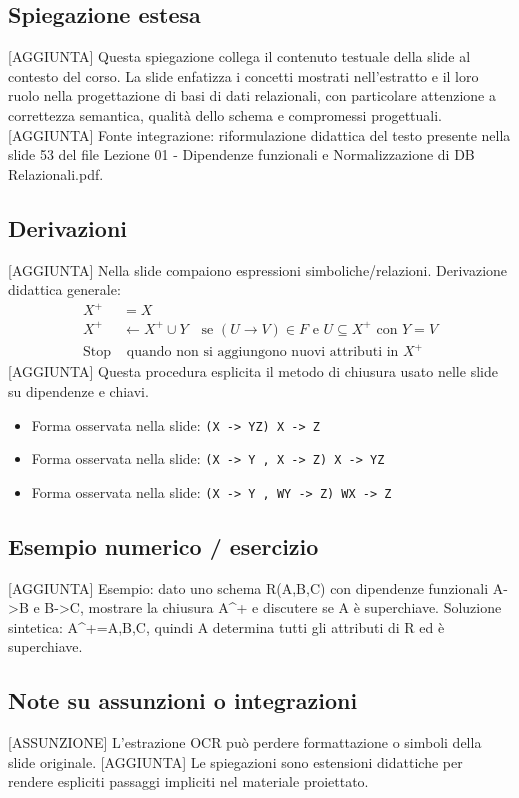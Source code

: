 \documentclass[11pt]{article}
\begin{document}
\subsection*{Spiegazione estesa}
[AGGIUNTA] Questa spiegazione collega il contenuto testuale della slide al contesto del corso. La slide enfatizza i concetti mostrati nell'estratto e il loro ruolo nella progettazione di basi di dati relazionali, con particolare attenzione a correttezza semantica, qualità dello schema e compromessi progettuali.
[AGGIUNTA] Fonte integrazione: riformulazione didattica del testo presente nella slide 53 del file Lezione 01 - Dipendenze funzionali e Normalizzazione di DB Relazionali.pdf.
\subsection*{Derivazioni}
[AGGIUNTA] Nella slide compaiono espressioni simboliche/relazioni. Derivazione didattica generale:
\begin{align*}
X^+ &= X \\
X^+ &\leftarrow X^+ \cup Y \quad \text{se } (U \to V) \in F \text{ e } U \subseteq X^+ \text{ con } Y=V \\
\text{Stop} &\text{ quando non si aggiungono nuovi attributi in } X^+
\end{align*}
[AGGIUNTA] Questa procedura esplicita il metodo di chiusura usato nelle slide su dipendenze e chiavi.
\begin{itemize}[leftmargin=*]
\item Forma osservata nella slide: \texttt{(X -> YZ)  X -> Z}
\item Forma osservata nella slide: \texttt{(X -> Y , X -> Z)  X -> YZ}
\item Forma osservata nella slide: \texttt{(X -> Y , WY -> Z)  WX -> Z}
\end{itemize}
\subsection*{Esempio numerico / esercizio}
[AGGIUNTA] Esempio: dato uno schema R(A,B,C) con dipendenze funzionali A->B e B->C, mostrare la chiusura A^+ e discutere se A è superchiave. Soluzione sintetica: A^+={A,B,C}, quindi A determina tutti gli attributi di R ed è superchiave.
\subsection*{Note su assunzioni o integrazioni}
[ASSUNZIONE] L'estrazione OCR può perdere formattazione o simboli della slide originale.
[AGGIUNTA] Le spiegazioni sono estensioni didattiche per rendere espliciti passaggi impliciti nel materiale proiettato.
\end{document}
